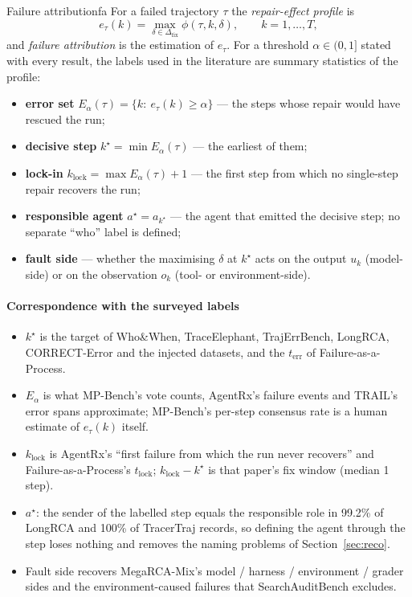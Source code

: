 \documentclass[10pt,a4paper]{article}
\begin{document}
\begin{definition}{Failure attribution}{fa}
For a failed trajectory $\tau$ the \emph{repair-effect profile} is
\[e_\tau(k)=\max_{\delta\in\Delta_{\mathrm{fix}}}\phi(\tau,k,\delta),\qquad k=1,\dots,T,\]
and \emph{failure attribution} is the estimation of $e_\tau$. For a threshold $\alpha\in(0,1]$ stated with every result, the labels used in the literature are summary statistics of the profile:
\begin{itemize}[leftmargin=1.1em]
\item \textbf{error set} $E_\alpha(\tau)=\{k:\ e_\tau(k)\ge\alpha\}$ --- the steps whose repair would have rescued the run;
\item \textbf{decisive step} $k^\star=\min E_\alpha(\tau)$ --- the earliest of them;
\item \textbf{lock-in} $k_{\mathrm{lock}}=\max E_\alpha(\tau)+1$ --- the first step from which no single-step repair recovers the run;
\item \textbf{responsible agent} $a^\star=a_{k^\star}$ --- the agent that emitted the decisive step; no separate ``who'' label is defined;
\item \textbf{fault side} --- whether the maximising $\delta$ at $k^\star$ acts on the output $u_k$ (model-side) or on the observation $o_k$ (tool- or environment-side).
\end{itemize}
\end{definition}

\paragraph{Correspondence with the surveyed labels}
\begin{itemize}[leftmargin=1.1em]
\item $k^\star$ is the target of Who\&When, TraceElephant, TrajErrBench, LongRCA, CORRECT-Error and the injected datasets, and the $t_{\mathrm{err}}$ of Failure-as-a-Process.
\item $E_\alpha$ is what MP-Bench's vote counts, AgentRx's failure events and TRAIL's error spans approximate; MP-Bench's per-step consensus rate is a human estimate of $e_\tau(k)$ itself.
\item $k_{\mathrm{lock}}$ is AgentRx's ``first failure from which the run never recovers'' and Failure-as-a-Process's $t_{\mathrm{lock}}$; $k_{\mathrm{lock}}-k^\star$ is that paper's fix window (median 1 step).
\item $a^\star$: the sender of the labelled step equals the responsible role in 99.2\% of LongRCA and 100\% of TracerTraj records, so defining the agent through the step loses nothing and removes the naming problems of Section~\ref{sec:reco}.
\item Fault side recovers MegaRCA-Mix's model / harness / environment / grader sides and the environment-caused failures that SearchAuditBench excludes.
\end{itemize}
\end{document}
